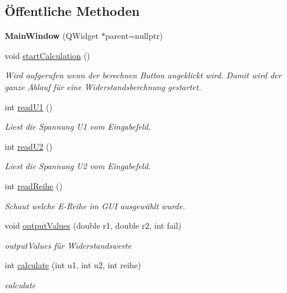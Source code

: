 \subsection*{Öffentliche Methoden}
\begin{DoxyCompactItemize}
\item 
\mbox{\label{classMainWindow_a996c5a2b6f77944776856f08ec30858d}} 
{\bfseries Main\+Window} (Q\+Widget $\ast$parent=nullptr)
\item 
\mbox{\label{classMainWindow_a2928be63df3071466644eca76d6e32a7}} 
void \hyperlink{classMainWindow_a2928be63df3071466644eca76d6e32a7}{start\+Calculation} ()
\begin{DoxyCompactList}\small\item\em Wird aufgerufen wenn der berechnen Button angeklickt wird. Damit wird der ganze Ablauf für eine Widerstandsberchnung gestartet. \end{DoxyCompactList}\item 
int \hyperlink{classMainWindow_a3b94ad2c855f6a0df3579c48b1a6f6fd}{read\+U1} ()
\begin{DoxyCompactList}\small\item\em Liest die Spannung U1 vom Eingabefeld. \end{DoxyCompactList}\item 
int \hyperlink{classMainWindow_ab9a4bb81031d0bcb5cc5d181a26f3429}{read\+U2} ()
\begin{DoxyCompactList}\small\item\em Liest die Spannung U2 vom Eingabefeld. \end{DoxyCompactList}\item 
int \hyperlink{classMainWindow_a4869d3468f1124ae508be8e177b66ed3}{read\+Reihe} ()
\begin{DoxyCompactList}\small\item\em Schaut welche E-\/\+Reihe im G\+UI ausgewählt wurde. \end{DoxyCompactList}\item 
void \hyperlink{classMainWindow_a12b9bbad12422386cec9da99c2ea3d57}{output\+Values} (double r1, double r2, int fail)
\begin{DoxyCompactList}\small\item\em output\+Values für Widerstandswerte \end{DoxyCompactList}\item 
int \hyperlink{classMainWindow_ab0f78571621e4f8e82f51464648cf017}{calculate} (int u1, int u2, int reihe)
\begin{DoxyCompactList}\small\item\em calculate \end{DoxyCompactList}\end{DoxyCompactItemize}


